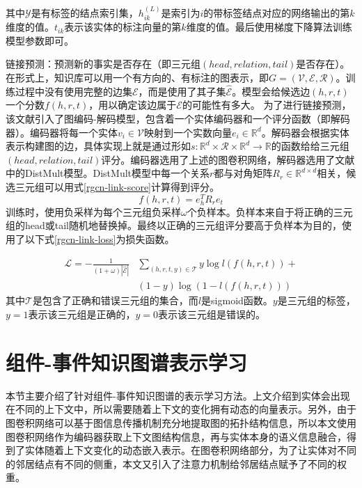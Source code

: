 其中$\mathcal{Y}$是有标签的结点索引集，$h_{i k}^{(L)}$是索引为$i$的带标签结点对应的网络输出的第$k$维度的值。$t_{i k}$表示该实体的标注向量的第$k$维度的值。最后使用梯度下降算法训练模型参数即可。

链接预测：预测新的事实是否存在（即三元组$(head,relation,tail)$是否存在）。在形式上，知识库可以用一个有方向的、有标注的图表示，即$G=(\mathcal{V}, \mathcal{E}, \mathcal{R})$。训练过程中没有使用完整的边集$\mathcal{E}$，而是使用了其子集$\hat{\mathcal{E}}$。模型会给候选边$(h, r, t)$一个分数$f(h, r, t)$，用以确定该边属于$\mathcal{E}$的可能性有多大。
为了进行链接预测，该文献引入了图编码-解码模型，包含着一个实体编码器和一个评分函数（即解码器）。编码器将每一个实体$v_{i} \in \mathcal{V}$映射到一个实数向量$e_{i} \in \mathbb{R}^{d}$。解码器会根据实体表示构建图的边，具体实现上就是通过形如$s: \mathbb{R}^{d} \times \mathcal{R} \times \mathbb{R}^{d} \rightarrow \mathbb{R}$的函数给给三元组$(head, relation, tail)$评分。编码器选用了上述的图卷积网络，解码器选用了文献\parencite{yang2014embedding}中的DistMult模型。DistMult模型中每一个关系$r$都与对角矩阵$R_{r} \in \mathbb{R}^{d \times d}$相关，候选三元组可以用式\ref{rgcn-link-score}计算得到评分。
\begin{equation}
    f(h, r, t)=e_{h}^{T} R_{r} e_{t}
    \label{rgcn-link-score}
\end{equation}
训练时，使用负采样为每个三元组负采样$\omega$个负样本。负样本来自于将正确的三元组的head或tail随机地替换掉。最终以正确的三元组评分要高于负样本为目的，使用了以下式\ref{rgcn-link-loss}为损失函数。

\begin{equation}
    \begin{aligned}
        \mathcal{L}=-\frac{1}{(1+\omega)|\hat{\mathcal{E}}|} & \sum_{(h, r, t, y) \in \mathcal{T}} y \log l(f(h, r, t))+\\
        &(1-y) \log (1-l(f(h, r, t)))
        \end{aligned}
    \label{rgcn-link-loss}
\end{equation}
其中$\mathcal{T}$是包含了正确和错误三元组的集合，而$l$是sigmoid函数。$y$是三元组的标签，$y=1$表示该三元组是正确的，$y=0$表示该三元组是错误的。

\section{组件-事件知识图谱表示学习}
本节主要介绍了针对组件-事件知识图谱的表示学习方法。上文介绍到实体会出现在不同的上下文中，所以需要随着上下文的变化拥有动态的向量表示。另外，由于图卷积网络可以基于图信息传播机制充分地提取图的拓扑结构信息，所以本文使用图卷积网络作为编码器获取上下文图结构信息，再与实体本身的语义信息融合，得到了实体随着上下文变化的动态嵌入表示。在图卷积网络部分，为了让实体对不同的邻居结点有不同的侧重，本文又引入了注意力机制给邻居结点赋予了不同的权重。
